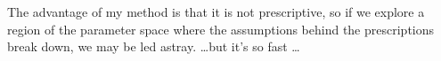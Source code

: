    The advantage of my method is that it is not prescriptive, so if we explore a region of the parameter space where the assumptions behind the prescriptions break down, we may be led astray. \dots but it's so fast \dots 







